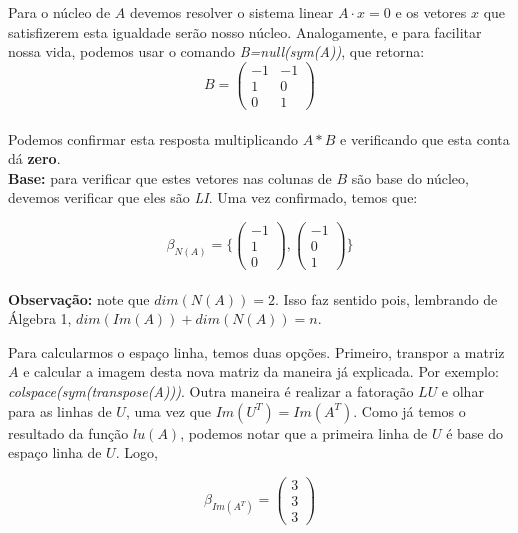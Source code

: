 \documentclass[12pt]{article}
\begin{document}
	Para o núcleo de $A$ devemos resolver o sistema linear $A\cdot x=0$ e os vetores $x$ que satisfizerem esta igualdade serão nosso núcleo. Analogamente, e para facilitar nossa vida, podemos usar o comando \textit{B=null(sym(A))}, que retorna:
	\begin{equation*}
		B=
		\begin{pmatrix}
			-1 & -1\\
			1 & 0\\
			0 & 1
		\end{pmatrix}	
	\end{equation*}\\
	
	Podemos confirmar esta resposta multiplicando $A*B$ e verificando que esta conta dá \textbf{zero}. \\
	
	\textbf{Base:} para verificar que estes vetores nas colunas de $B$ são base do núcleo, devemos verificar que eles são \textit{LI}. Uma vez confirmado, temos que:
	
	\begin{equation*}
		\beta_{N(A)}= \{
		\begin{pmatrix}
			-1\\
			1\\
			0
		\end{pmatrix},
		\begin{pmatrix}
			-1\\
			0\\
			1
		\end{pmatrix}	\}
	\end{equation*}\\
	
	\textbf{Observação:} note que $dim(N(A))=2$. Isso faz sentido pois, lembrando de Álgebra 1, $dim(Im(A))+dim(N(A))=n$.
	
	Para calcularmos o espaço linha, temos duas opções. Primeiro, transpor a matriz $A$ e calcular a imagem desta nova matriz da maneira já explicada. Por exemplo: \textit{colspace(sym(transpose(A)))}. Outra maneira é realizar a fatoração $LU$ e olhar para as linhas de $U$, uma vez que $Im(U^T)=Im(A^T)$. Como já temos o resultado da função $lu(A)$, podemos notar que a primeira linha de $U$ é base do espaço linha de $U$. Logo,
	
	\begin{equation*}
		\beta_{Im(A^T)}= 
		\begin{pmatrix}
			3\\
			3\\
			3
		\end{pmatrix}	
	\end{equation*}\\
	
\end{document}
